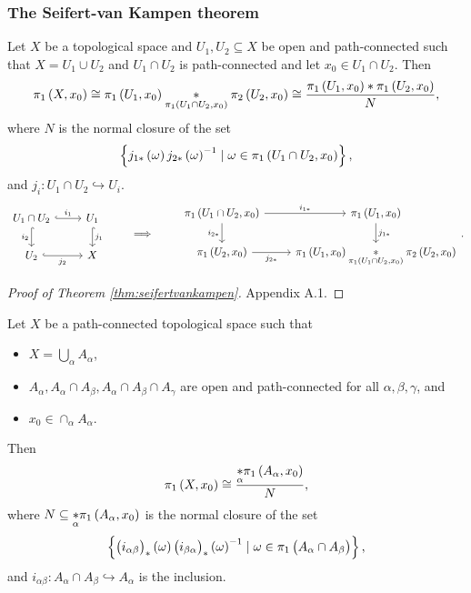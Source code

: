 \subsubsection{The Seifert-van Kampen theorem}

\begin{theorem}
\label{thm:seifertvankampen}
Let $ X $ be a topological space and $ U_1, U_2 \subseteq X $ be open and path-connected such that $ X = U_1 \cup U_2 $ and $ U_1 \cap U_2 $ is path-connected and let $ x_0 \in U_1 \cap U_2 $. Then
$$ \pi_1\br{X, x_0} \cong \pi_1\br{U_1, x_0} \underset{\pi_1\br{U_1 \cap U_2, x_0}}{*} \pi_2\br{U_2, x_0} \cong \dfrac{\pi_1\br{U_1, x_0} * \pi_1\br{U_2, x_0}}{N}, $$
where $ N $ is the normal closure of the set
$$ \cbr{j_{1*}\br{\omega}j_{2*}\br{\omega}^{-1} \mid \omega \in \pi_1\br{U_1 \cap U_2, x_0}}, $$
and $ j_i : U_1 \cap U_2 \hookrightarrow U_i $.
$$
\begin{tikzcd}
U_1 \cap U_2 \arrow[hookrightarrow]{r}{i_1} \arrow[hookrightarrow, swap]{d}{i_2} & U_1 \arrow[hookrightarrow]{d}{j_1} \\
U_2 \arrow[hookrightarrow, swap]{r}{j_2} & X
\end{tikzcd}
\qquad \implies \qquad
\begin{tikzcd}
\pi_1\br{U_1 \cap U_2, x_0} \arrow{r}{i_{1*}} \arrow[swap]{d}{i_{2*}} & \pi_1\br{U_1, x_0} \arrow{d}{j_{1*}} \\
\pi_1\br{U_2, x_0} \arrow[swap]{r}{j_{2*}} & \pi_1\br{U_1, x_0} \underset{\pi_1\br{U_1 \cap U_2, x_0}}{*} \pi_2\br{U_2, x_0}
\end{tikzcd}.
$$
\end{theorem}

\begin{proof}[Proof of Theorem \ref{thm:seifertvankampen}]
Appendix A.1.
\end{proof}

\pagebreak


\begin{theorem}
Let $ X $ be a path-connected topological space such that
\begin{itemize}
\item $ X = \bigcup_\alpha A_\alpha $,
\item $ A_\alpha, A_\alpha \cap A_\beta, A_\alpha \cap A_\beta \cap A_\gamma $ are open and path-connected for all $ \alpha, \beta, \gamma $, and
\item $ x_0 \in \cap_\alpha A_\alpha $.
\end{itemize}
Then
$$ \pi_1\br{X, x_0} \cong \dfrac{\underset{\alpha}{*} \pi_1\br{A_\alpha, x_0}}{N}, $$
where $ N \subseteq \underset{\alpha}{*} \pi_1\br{A_\alpha, x_0} $ is the normal closure of the set
$$ \cbr{\br{i_{\alpha\beta}}_*\br{\omega}\br{i_{\beta\alpha}}_*\br{\omega}^{-1} \mid \omega \in \pi_1\br{A_\alpha \cap A_\beta}}, $$
and $ i_{\alpha\beta} : A_\alpha \cap A_\beta \hookrightarrow A_\alpha $ is the inclusion.
\end{theorem}

